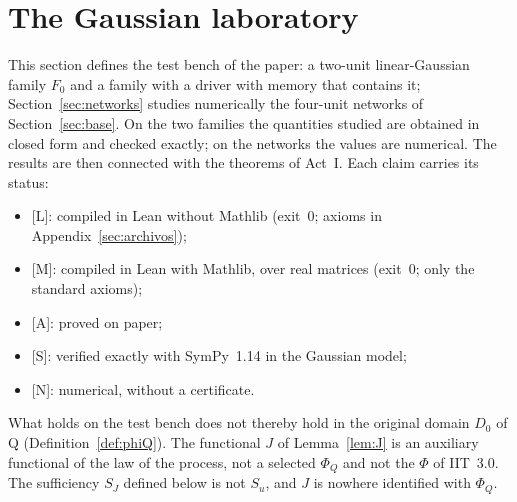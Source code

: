 \section{The Gaussian laboratory}\label{sec:gauss}
\providecommand{\stL}{\textsf{[L]}}\providecommand{\stA}{\textsf{[A]}}\providecommand{\stM}{\textsf{[M]}}\providecommand{\stS}{\textsf{[S]}}\providecommand{\stN}{\textsf{[N]}}
This section defines the test bench of the paper: a two-unit linear-Gaussian family $F_0$ and a family with a driver with memory that contains it; Section~\ref{sec:networks} studies numerically the four-unit networks of Section~\ref{sec:base}. On the two families the quantities studied are obtained in closed form and checked exactly; on the networks the values are numerical. The results are then connected with the theorems of Act~I. Each claim carries its status:
\begin{itemize}
\item \stL: compiled in Lean without Mathlib (exit~0; axioms in Appendix~\ref{sec:archivos});
\item \stM: compiled in Lean with Mathlib, over real matrices (exit~0; only the standard axioms);
\item \stA: proved on paper;
\item \stS: verified exactly with SymPy~1.14 in the Gaussian model;
\item \stN: numerical, without a certificate.
\end{itemize}
What holds on the test bench does not thereby hold in the original domain $D_0$ of Q (Definition~\ref{def:phiQ}). The functional $J$ of Lemma~\ref{lem:J} is an auxiliary functional of the law of the process, not a selected $\Phi_Q$ and not the $\Phi$ of IIT~3.0. The sufficiency $S_J$ defined below is not $S_u$, and $J$ is nowhere identified with $\Phi_Q$.

